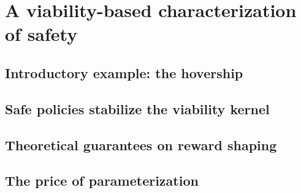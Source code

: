 \chapter{A viability-based characterization of safety} \label{chap:safety from viability}


\section{Introductory example: the hovership}

\section{Safe policies stabilize the viability kernel}

\section{Theoretical guarantees on reward shaping}

\section{The price of parameterization}